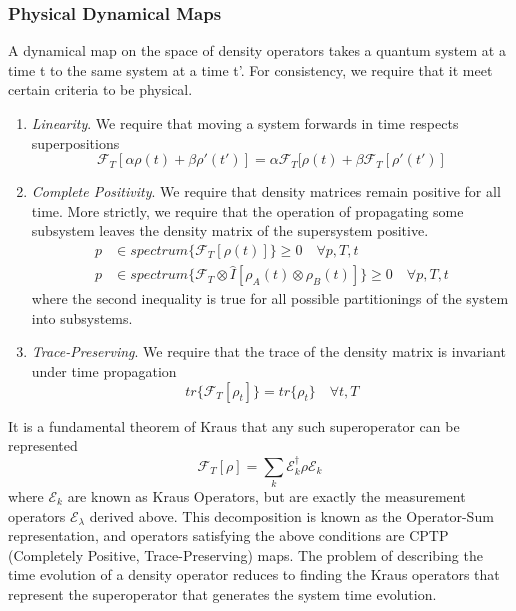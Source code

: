 \subsubsection{Physical Dynamical Maps}
A dynamical map on the space of density operators takes a quantum system at a time t to the same system at a time t'.
For consistency, we require that it meet certain criteria to be physical.
\begin{enumerate}
    \item \emph{Linearity}. We require that moving a system forwards in time respects superpositions 
        \begin{equation}
            \mathscr{F}_T[\alpha\rho(t) + \beta\rho'(t')] = \alpha \mathscr{F}_T[\rho(t) + \beta \mathscr{F}_T[\rho'(t')]
        \end{equation}
    \item \emph{Complete Positivity}.  We require that density matrices remain positive for all time.
        More strictly, we require that the operation of propagating some subsystem leaves the density matrix of the supersystem positive.
        \begin{align}
            p & \in  spectrum \{\mathscr{F}_T[\rho(t)]\} \geq  0\quad \forall p, T, t\\
            p & \in  spectrum \{\mathscr{F}_T \otimes \hat{I} [\rho_A(t) \otimes\rho_B(t) ] \} \geq 0 \quad \forall p, T, t
        \end{align}
        where the second inequality is true for all possible partitionings of the system into subsystems.
    \item \emph{Trace-Preserving}. We require that the trace of the density matrix is invariant under time propagation
        \begin{equation}
            tr\{ \mathscr{F}_T[\rho_t] \} = tr \{ \rho_t \} \quad \forall t, T
        \end{equation}
\end{enumerate}
It is a fundamental theorem of Kraus \cite{Kraus1983} that any such superoperator can be represented\cite{Nielsen2010}
\begin{equation}
    \mathscr{F}_T[\rho] = \sum_k \mathscr{E}_k^\dagger \rho \mathscr{E}_k
\end{equation}
where $\mathscr{E}_k $ are known as Kraus Operators, but are exactly the measurement operators $\mathscr{E}_\lambda$ derived above.
This decomposition is known as the Operator-Sum representation\cite{Nielsen2010}, and operators satisfying the above conditions are CPTP (Completely Positive, Trace-Preserving) maps.
The problem of describing the time evolution of a density operator reduces to finding the Kraus operators that represent the superoperator that generates the system time evolution.

